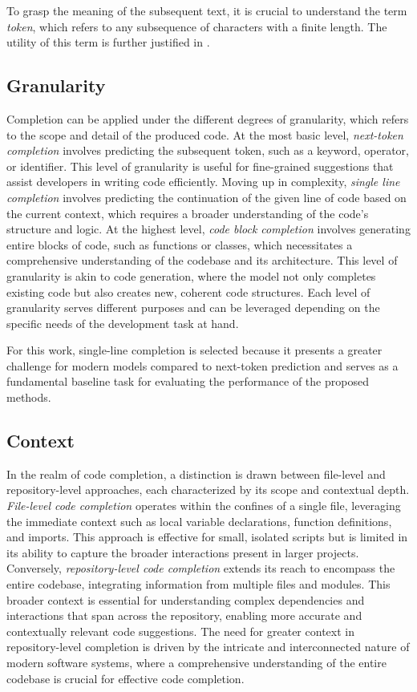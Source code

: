 To grasp the meaning of the subsequent text, it is crucial to understand the term \textit{token}, which refers to any subsequence of characters with a finite length. The utility of this term is further justified in .

\subsection{Granularity}

Completion can be applied under the different degrees of granularity, which refers to the scope and detail of the produced code. At the most basic level, \textit{next-token completion} involves predicting the subsequent token, such as a keyword, operator, or identifier. This level of granularity is useful for fine-grained suggestions that assist developers in writing code efficiently. Moving up in complexity, \textit{single line completion} involves predicting the continuation of the given line of code based on the current context, which requires a broader understanding of the code's structure and logic. At the highest level, \textit{code block completion} involves generating entire blocks of code, such as functions or classes, which necessitates a comprehensive understanding of the codebase and its architecture. This level of granularity is akin to code generation, where the model not only completes existing code but also creates new, coherent code structures. Each level of granularity serves different purposes and can be leveraged depending on the specific needs of the development task at hand.

For this work, single-line completion is selected because it presents a greater challenge for modern models compared to next-token prediction and serves as a fundamental baseline task for evaluating the performance of the proposed methods.

\subsection{Context}

In the realm of code completion, a distinction is drawn between file-level and repository-level approaches, each characterized by its scope and contextual depth. \textit{File-level code completion} operates within the confines of a single file, leveraging the immediate context such as local variable declarations, function definitions, and imports. This approach is effective for small, isolated scripts but is limited in its ability to capture the broader interactions present in larger projects. Conversely, \textit{repository-level code completion} extends its reach to encompass the entire codebase, integrating information from multiple files and modules. This broader context is essential for understanding complex dependencies and interactions that span across the repository, enabling more accurate and contextually relevant code suggestions. The need for greater context in repository-level completion is driven by the intricate and interconnected nature of modern software systems, where a comprehensive understanding of the entire codebase is crucial for effective code completion.

